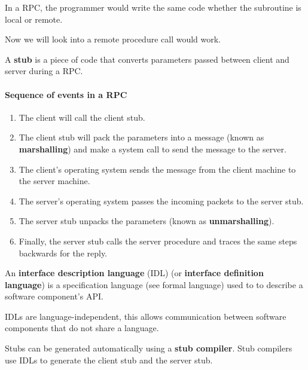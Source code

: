 \begin{remark}
    In a RPC, the programmer would write the same code
    whether the subroutine is local or remote.
\end{remark}

Now we will look into a remote procedure call would work.

\begin{definition}[Stub]
    A \textbf{stub} is a piece of code that converts parameters passed
    between client and server during a RPC.
\end{definition}

\paragraph{Sequence of events in a RPC}
\begin{enumerate}
    \item 
        The client will call the client stub.

    \item 
        The client stub will pack the parameters into a message 
        (known as \textbf{marshalling})
        and make a system call to send the message to the server.

    \item 
        The client's operating system sends the message from the client
        machine to the server machine.

    \item 
        The server's operating system passes the incoming packets
        to the server stub.

    \item 
        The server stub unpacks the parameters
        (known as \textbf{unmarshalling}).
    \item 
        Finally, the server stub calls the server procedure and traces the same
        steps backwards for the reply.
\end{enumerate}

\begin{definition}
    An \textbf{interface description language} (IDL) (or \textbf{interface definition language})
    is a specification language (see formal language)
    used to to describe a software component's API.
\end{definition}

\begin{remark}
    IDLs are language-independent, 
    this allows communication between software components that do not share 
    a language.
\end{remark}

Stubs can be generated automatically using a \textbf{stub compiler}.
Stub compilers use IDLs to generate the client stub and the server stub.
